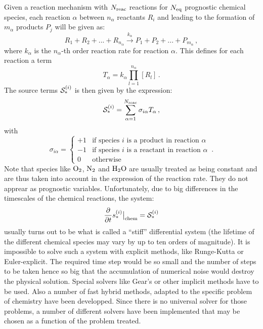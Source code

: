 Given a reaction mechanism with $N_{\rm reac}$ reactions for $N_{\rm eq}$ prognostic
chemical species,
each reaction $\alpha$ between $n_\alpha$
reactants $R_i$ and leading to the formation
of $m_\alpha$ products $P_j$ will be given as:
%
\begin{equation}
R_1 + R_2 + ... + R_{n_\alpha} \stackrel{k_\alpha}{\longrightarrow}
P_1 + P_2 + ... + P_{m_\alpha}
\,,
\end{equation}
%
where $k_\alpha$ is the $n_\alpha$-th order reaction rate for reaction $\alpha$.
This defines for each reaction a term
%
\begin{equation}
  T_\alpha = k_\alpha \prod_{l=1}^{n_\alpha} [R_l]
  \,.
\end{equation}
%
The source terms ${\cal S}_\ast^{(i)}$ is then given by the expression:
%
\begin{equation}
  {\cal S}_\ast^{(i)} = \sum_{\alpha=1}^{N_{\rm reac}} \sigma_{i\alpha}  T_\alpha
  \,,
\end{equation}
%
with
%
\begin{equation}
  \sigma_{i\alpha} = \left\{
    \begin{array}{rl}
      +1 & \mbox{if species $i$ is a product in reaction $\alpha$} \\
      -1 & \mbox{if species $i$ is a reactant in reaction $\alpha$} \\
      0 & \mbox{otherwise}
    \end{array}
  \right.\,.
\end{equation}
%
Note that species like $\rm O_2$, $\rm N_2$ and $\rm H_2O$
are usually treated as being  constant and are thus taken into account
in the expression of the reaction rate.
They do not apprear as prognostic variables.
Unfortunately, due to big differences in the timescales of the
chemical reactions, the system:
%
\begin{equation}
  \frac{\partial}{\partial t} {s}_\ast^{(i)}\big|_{\rm chem} = {\cal S}_\ast^{(i)}
\end{equation}
%
usually turns out to be what is called a ``stiff'' differential system
(the lifetime of the different chemical species may vary by up to
ten orders of magnitude). 
It is impossible to solve such a system with explicit methods, like
Runge-Kutta or Euler-explicit.
The required time step would be so small and the number
of steps to be taken hence so big that the accumulation of numerical
noise would destroy the physical solution.
Special solvers like Gear's or other implicit methods have to be used.
Also a number of fast hybrid methods, adapted to the specific problem
of chemistry have been developped.
Since there is no universal solver for those problems,
a number of different solvers have been implemented that may
be chosen as a function of the problem treated.

